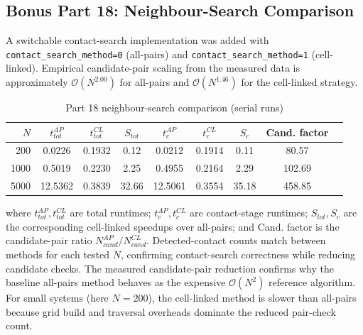 \subsection{Bonus Part 18: Neighbour-Search Comparison}
A switchable contact-search implementation was added with \texttt{contact\_search\_method=0} (all-pairs) and \texttt{contact\_search\_method=1} (cell-linked).
Empirical candidate-pair scaling from the measured data is approximately $\mathcal{O}(N^{2.00})$ for all-pairs and $\mathcal{O}(N^{1.46})$ for the cell-linked strategy.
\begin{table}[!t]
\scriptsize
\centering
\caption{Part 18 neighbour-search comparison (serial runs)}
\label{tab:part18-neighbour-search}
\begin{tabular}{rcccccccc}
\toprule
$N$ & $t_{tot}^{AP}$ & $t_{tot}^{CL}$ & $S_{tot}$ & $t_c^{AP}$ & $t_c^{CL}$ & $S_c$ & Cand. factor \\
\midrule
200 & 0.0226 & 0.1932 & 0.12 & 0.0212 & 0.1914 & 0.11 & 80.57 \\
1000 & 0.5019 & 0.2230 & 2.25 & 0.4955 & 0.2164 & 2.29 & 102.69 \\
5000 & 12.5362 & 0.3839 & 32.66 & 12.5061 & 0.3554 & 35.18 & 458.85 \\
\bottomrule
\end{tabular}
\end{table}
where $t_{tot}^{AP}, t_{tot}^{CL}$ are total runtimes; $t_c^{AP}, t_c^{CL}$ are contact-stage runtimes; $S_{tot}, S_c$ are the corresponding cell-linked speedups over all-pairs; and Cand. factor is the candidate-pair ratio $N_{cand}^{AP}/N_{cand}^{CL}$.
Detected-contact counts match between methods for each tested $N$, confirming contact-search correctness while reducing candidate checks.
The measured candidate-pair reduction confirms why the baseline all-pairs method behaves as the expensive $\mathcal{O}(N^2)$ reference algorithm.
For small systems (here $N=200$), the cell-linked method is slower than all-pairs because grid build and traversal overheads dominate the reduced pair-check count.
